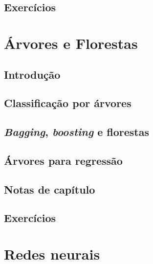 \documentclass[
]{latex/krantz}
\theoremstyle{definition}
\theoremstyle{definition}
\theoremstyle{definition}
\theoremstyle{definition}
\theoremstyle{remark}
\begin{document}
\hypertarget{exercuxedcios-8}{%
\section{Exercícios}\label{exercuxedcios-8}}

\hypertarget{uxe1rvores-e-florestas}{%
\chapter{Árvores e Florestas}\label{uxe1rvores-e-florestas}}

\hypertarget{introduuxe7uxe3o-9}{%
\section{Introdução}\label{introduuxe7uxe3o-9}}

\hypertarget{classificauxe7uxe3o-por-uxe1rvores}{%
\section{Classificação por árvores}\label{classificauxe7uxe3o-por-uxe1rvores}}

\hypertarget{bagging-boosting-e-florestas}{%
\section{\texorpdfstring{\emph{Bagging}, \emph{boosting} e florestas}{Bagging, boosting e florestas}}\label{bagging-boosting-e-florestas}}

\hypertarget{uxe1rvores-para-regressuxe3o}{%
\section{Árvores para regressão}\label{uxe1rvores-para-regressuxe3o}}

\hypertarget{notas-de-capuxedtulo-9}{%
\section{Notas de capítulo}\label{notas-de-capuxedtulo-9}}

\hypertarget{exercuxedcios-9}{%
\section{Exercícios}\label{exercuxedcios-9}}

\hypertarget{redes-neurais}{%
\chapter{Redes neurais}\label{redes-neurais}}
\end{document}
